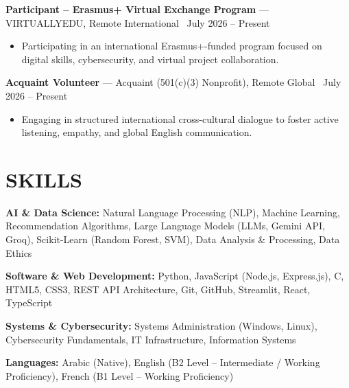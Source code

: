 \documentclass[10pt, letterpaper]{article}
\newcommand{\entry}[4]{%
  \noindent\textbf{#1} --- #3, #4 \textbar\ #2\par
  \vspace{0.5pt}
}
\newcommand{\resumeItem}[1]{\item #1}
\begin{document}
\entry{Participant -- Erasmus+ Virtual Exchange Program}{July 2026 -- Present}{VIRTUALLYEDU}{Remote International}
\begin{itemize}
  \resumeItem{Participating in an international Erasmus+-funded program focused on digital skills, cybersecurity, and virtual project collaboration.}
\end{itemize}

\entry{Acquaint Volunteer}{July 2026 -- Present}{Acquaint (501(c)(3) Nonprofit)}{Remote Global}
\begin{itemize}
  \resumeItem{Engaging in structured international cross-cultural dialogue to foster active listening, empathy, and global English communication.}
\end{itemize}

\section{SKILLS}
\noindent\textbf{AI \& Data Science:} Natural Language Processing (NLP), Machine Learning, Recommendation Algorithms, Large Language Models (LLMs, Gemini API, Groq), Scikit-Learn (Random Forest, SVM), Data Analysis \& Processing, Data Ethics\par
\noindent\textbf{Software \& Web Development:} Python, JavaScript (Node.js, Express.js), C, HTML5, CSS3, REST API Architecture, Git, GitHub, Streamlit, React, TypeScript\par
\noindent\textbf{Systems \& Cybersecurity:} Systems Administration (Windows, Linux), Cybersecurity Fundamentals, IT Infrastructure, Information Systems\par
\noindent\textbf{Languages:} Arabic (Native), English (B2 Level -- Intermediate / Working Proficiency), French (B1 Level -- Working Proficiency)
\end{document}

